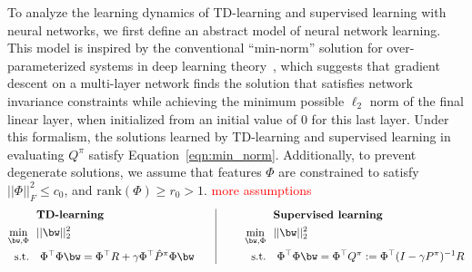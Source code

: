 
To analyze the learning dynamics of TD-learning and supervised learning with neural networks, we first define an abstract model of neural network learning. This model is inspired by the conventional ``min-norm'' solution for over-parameterized systems in deep learning theory~\citep{hastie2019surprises,savarese2019infinite,woodworth2020kernel}, which suggests that gradient descent on a multi-layer network finds the solution that satisfies network invariance constraints
while achieving the minimum possible $\ell_2$ norm of the final linear layer, when initialized from an initial value of $0$ for this last layer.
Under this formalism, the solutions learned by TD-learning and supervised learning in evaluating $Q^\pi$ satisfy Equation~\ref{eqn:min_norm}. 
Additionally, to prevent degenerate solutions, we assume that features $\Phi$ are constrained to satisfy $||\Phi||^2_F \leq c_0$, and $\mathrm{rank}(\Phi) \geq r_0 > 1$. \textcolor{red}{more assumptions}
\begin{equation}
\begin{aligned}
    &\text{\textbf{TD-learning}} \\
    \min_{\bw, \Phi}~~& ||\bw||_2^2 \nonumber\\
    \text{s.t.}~~&~ {\Phi}^\top {\Phi} \bw = {\Phi}^\top R + \gamma {\Phi}^\top \hat{P}^\pi \Phi \bw
\end{aligned}
\;~~~~~ \vline\;
\begin{aligned}
    &\text{\textbf{Supervised learning}} \\
    ~~~~~~~\min_{\bw, \Phi}~~& ||\bw||_2^2 \nonumber\\
    \text{s.t.}~~&~ {\Phi}^\top {\Phi} \bw = {\Phi}^\top Q^\pi := {\Phi}^\top (I - \gamma P^\pi)^{-1} R
\end{aligned}
\label{eqn:min_norm}
\end{equation}
